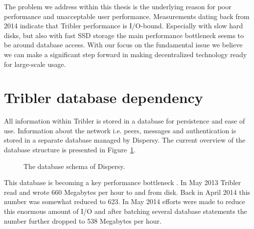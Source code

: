 The problem we address within this thesis is the underlying reason for poor performance and unacceptable user performance. Measurements dating back from 2014 indicate that Tribler performance is I/O-bound.
Especially with slow hard disks, but also with fast SSD storage the main performance bottleneck seems to be around database access.
With our focus on the fundamental issue we believe we can make a significant step forward in making decentralized technology ready for large-scale usage. 

\section{Tribler database dependency}

All information within Tribler is stored in a database for persistence and ease of use.
Information about the network i.e. peers, messages and authentication is stored in a separate database managed by Dispersy.
The current overview of the database structure is presented in Figure~\ref{fig:dispersy_database_schema}.

\begin{figure}[h]
	\caption{The database schema of Dispersy.}
	\label{fig:dispersy_database_schema}
\end{figure}

This database is becoming a key performance bottleneck \cite{pouwelse2014reduce}.
In May 2013 Tribler read and wrote 660 Megabytes per hour to and from disk.
Back in April 2014 this number was somewhat reduced to 623.
In May 2014 efforts were made to reduce this enormous amount of I/O and after batching several database statements the number further dropped to 538 Megabytes per hour.

